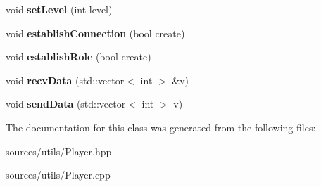 \begin{DoxyCompactItemize}
\mbox{\label{classPlayer_af717f3bf17090888a9d504d3919d62cd}} 
void {\bfseries set\+Level} (int level)
\item 
\mbox{\label{classPlayer_a3a573dd4bf5e1d241684a0eea064461c}} 
void {\bfseries establish\+Connection} (bool create)
\item 
\mbox{\label{classPlayer_a28cf39bcf811455210045ced3eeb73da}} 
void {\bfseries establish\+Role} (bool create)
\item 
\mbox{\label{classPlayer_aec43cf0af5b0b2dec1facb35a407f975}} 
void {\bfseries recv\+Data} (std\+::vector$<$ int $>$ \&v)
\item 
\mbox{\label{classPlayer_aeb26fb2ea26e531208d1c8d1e22115a3}} 
void {\bfseries send\+Data} (std\+::vector$<$ int $>$ v)
\end{DoxyCompactItemize}


The documentation for this class was generated from the following files\+:\begin{DoxyCompactItemize}
\item 
sources/utils/Player.\+hpp\item 
sources/utils/Player.\+cpp\end{DoxyCompactItemize}
